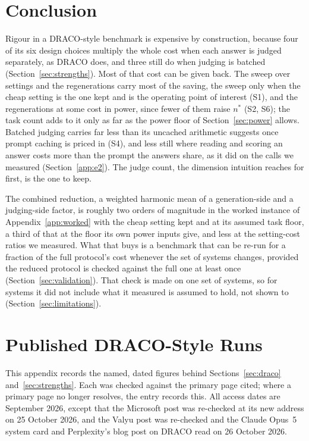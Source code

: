 \documentclass[11pt]{article}
\newcommand{\sectionbreak}{\par\ifdim\pagetotal<5.5\baselineskip\relax\else\clearpage\fi}
\begin{document}
\section{Conclusion}

Rigour in a DRACO-style benchmark is expensive by construction, because four of its six design choices multiply the whole cost when each answer is judged separately, as DRACO does, and three still do when judging is batched (Section~\ref{sec:strengths}). Most of that cost can be given back. The sweep over settings and the regenerations carry most of the saving, the sweep only when the cheap setting is the one kept and is the operating point of interest (S1), and the regenerations at some cost in power, since fewer of them raise $n^*$ (S2, S6); the task count adds to it only as far as the power floor of Section~\ref{sec:power} allows. Batched judging carries far less than its uncached arithmetic suggests once prompt caching is priced in (S4), and less still where reading and scoring an answer costs more than the prompt the answers share, as it did on the calls we measured (Section~\ref{app:e2}). The judge count, the dimension intuition reaches for first, is the one to keep.

The combined reduction, a weighted harmonic mean of a generation-side and a judging-side factor, is roughly two orders of magnitude in the worked instance of Appendix~\ref{app:worked} with the cheap setting kept and at its assumed task floor, a third of that at the floor its own power inputs give, and less at the setting-cost ratios we measured. What that buys is a benchmark that can be re-run for a fraction of the full protocol's cost whenever the set of systems changes, provided the reduced protocol is checked against the full one at least once (Section~\ref{sec:validation}). That check is made on one set of systems, so for systems it did not include what it measured is assumed to hold, not shown to (Section~\ref{sec:limitations}).

\appendix

\sectionbreak
\section{Published DRACO-Style Runs}
\label{app:published}

This appendix records the named, dated figures behind Sections~\ref{sec:draco}
and~\ref{sec:strengths}. Each was checked against the primary page cited; where a primary page no longer resolves, the entry records this. All access dates are September 2026, except that the Microsoft post was re-checked at its new address on 25 October 2026, and the Valyu post was re-checked and the Claude Opus~5 system card \citep{anthropic2026opus5} and Perplexity's blog post on DRACO \citep{perplexity2026explainer} read on 26 October 2026.
\end{document}
